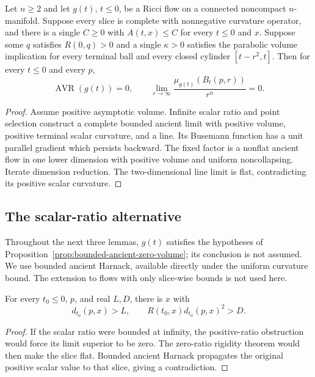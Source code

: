 \begin{proposition}
\label{prop:bounded-ancient-zero-volume}
Let $n\geq2$ and let $g(t)$, $t\leq0$, be a Ricci flow on a connected
noncompact $n$-manifold.  Suppose every slice is complete with
nonnegative curvature operator, and there is a single $C\geq0$
with $A(t,x)\leq C$ for every $t\leq0$ and $x$.
Suppose some $q$ satisfies $R(0,q)>0$ and a single
$\kappa>0$ satisfies the parabolic volume implication for every
terminal ball and every closed cylinder $[t-r^2,t]$.
Then for every $t\leq0$ and every $p$,
\[
 \operatorname{AVR}(g(t))=0,\qquad
 \lim_{r\to\infty}\frac{\mu_{g(t)}(B_t(p,r))}{r^n}=0 .
\]
\end{proposition}
\begin{proof}
Assume positive asymptotic volume. Infinite scalar ratio and point selection
construct a complete bounded ancient limit with positive volume, positive
terminal scalar curvature, and a line. Its Busemann function has a unit
parallel gradient which persists backward. The fixed factor is a nonflat
ancient flow in one lower dimension with positive volume and uniform
noncollapsing. Iterate dimension reduction. The two-dimensional line limit is
flat, contradicting its positive scalar curvature.
\end{proof}

\subsection{The scalar-ratio alternative}

Throughout the next three lemmas, $g(t)$ satisfies the hypotheses
of Proposition~\ref{prop:bounded-ancient-zero-volume}; its conclusion
is not assumed.  We use bounded ancient Harnack, available directly
under the uniform curvature bound.  The extension to flows with
only slice-wise bounds is not used here.

\begin{lemma}
\label{lem:ancient-infinite-scalar-ratio}
For every $t_0\leq0$, $p$, and real $L,D$, there is $x$ with
\[
 d_{t_0}(p,x)>L,\qquad R(t_0,x)d_{t_0}(p,x)^2>D.
\]
\end{lemma}
\begin{proof}
If the scalar ratio were bounded at infinity, the positive-ratio obstruction
would force its limit superior to be zero. The zero-ratio rigidity theorem
would then make the slice flat. Bounded ancient Harnack propagates the
original positive scalar value to that slice, giving a contradiction.
\end{proof}

